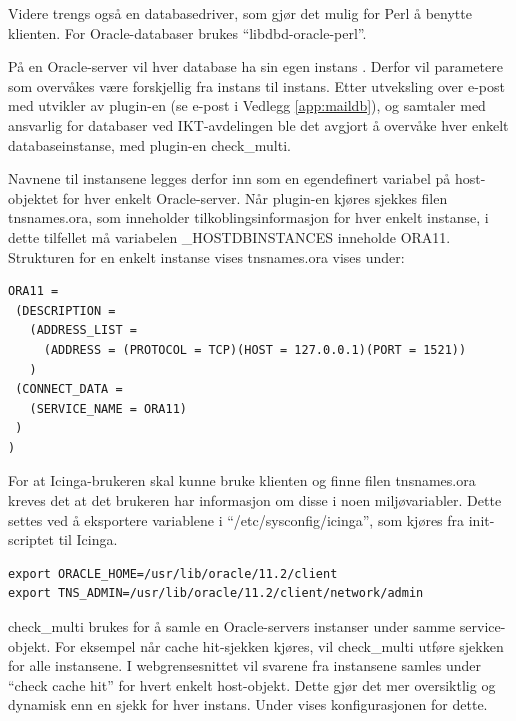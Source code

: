 Videre trengs også en databasedriver, som gjør det mulig for Perl å benytte klienten. For Oracle-databaser brukes ``libdbd-oracle-perl''.

På en Oracle-server vil hver database ha sin egen instans \cite{oraclefaq}. Derfor vil parametere som overvåkes være forskjellig fra instans til instans. Etter utveksling over e-post med utvikler av plugin-en (se e-post i Vedlegg \ref{app:maildb}), og samtaler med ansvarlig for databaser ved IKT-avdelingen ble det avgjort å overvåke hver enkelt databaseinstanse, med plugin-en check\_multi.

Navnene til instansene legges derfor inn som en egendefinert variabel på host-objektet for hver enkelt Oracle-server. Når plugin-en kjøres sjekkes filen tnsnames.ora, som inneholder tilkoblingsinformasjon for hver enkelt instanse, i dette tilfellet må variabelen \_HOSTDBINSTANCES inneholde ORA11. Strukturen for en enkelt instanse vises tnsnames.ora vises under:
\begin{lstlisting}[style=example]
ORA11 =
 (DESCRIPTION = 
   (ADDRESS_LIST =
     (ADDRESS = (PROTOCOL = TCP)(HOST = 127.0.0.1)(PORT = 1521))
   )
 (CONNECT_DATA =
   (SERVICE_NAME = ORA11)
 )
)
\end{lstlisting}

For at Icinga-brukeren skal kunne bruke klienten og finne filen tnsnames.ora kreves det at det brukeren har informasjon om disse i noen miljøvariabler. Dette settes ved å eksportere variablene i ``/etc/sysconfig/icinga'', som kjøres fra init-scriptet til Icinga.
\begin{lstlisting}[style=example]
export ORACLE_HOME=/usr/lib/oracle/11.2/client
export TNS_ADMIN=/usr/lib/oracle/11.2/client/network/admin
\end{lstlisting}

check\_multi brukes for å samle en Oracle-servers instanser under samme service-objekt. For eksempel når cache hit-sjekken kjøres, vil check\_multi utføre sjekken for alle instansene. I webgrensesnittet vil svarene fra instansene samles under ``check cache hit'' for hvert enkelt host-objekt. Dette gjør det mer oversiktlig og dynamisk enn en sjekk for hver instans. Under vises konfigurasjonen for dette.

